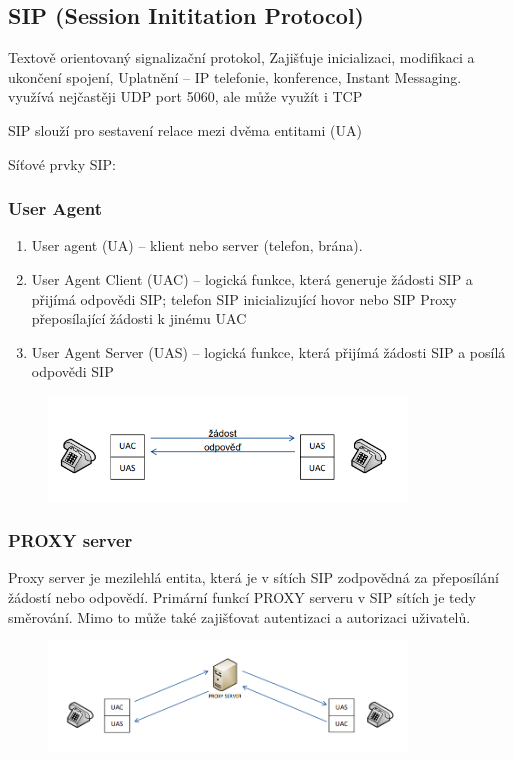 \subsection{SIP (Session Inititation Protocol)}
Textově orientovaný signalizační protokol, Zajišťuje inicializaci, modifikaci a ukončení spojení, Uplatnění – IP telefonie, konference, Instant Messaging. využívá nejčastěji UDP port 5060, ale může využít i TCP


SIP slouží pro sestavení relace mezi dvěma entitami (UA)

Síťové prvky SIP:
\subsubsection{User Agent}
\begin{enumerate}
    \item User agent (UA) -- klient nebo server (telefon, brána).
    \item User Agent Client (UAC) -- logická funkce, která generuje žádosti SIP a přijímá odpovědi SIP; telefon SIP inicializující hovor nebo SIP Proxy přeposílající žádosti k jinému UAC
    \item User Agent Server (UAS) -- logická funkce, která přijímá žádosti SIP a posílá odpovědi SIP
\end{enumerate}
\begin{figure} [h]
     \centering
     \includegraphics[width=0.85\textwidth]{images/bod-bod.PNG}
\end{figure}
\subsubsection{PROXY server}
Proxy server je mezilehlá entita, která je v sítích SIP zodpovědná za
přeposílání žádostí nebo odpovědí. Primární funkcí PROXY serveru v SIP
sítích je tedy směrování. Mimo to může také zajišťovat autentizaci a
autorizaci uživatelů.
\begin{figure} [h]
     \centering
     \includegraphics[width=0.85\textwidth]{images/bod-proxy.PNG}
\end{figure}

